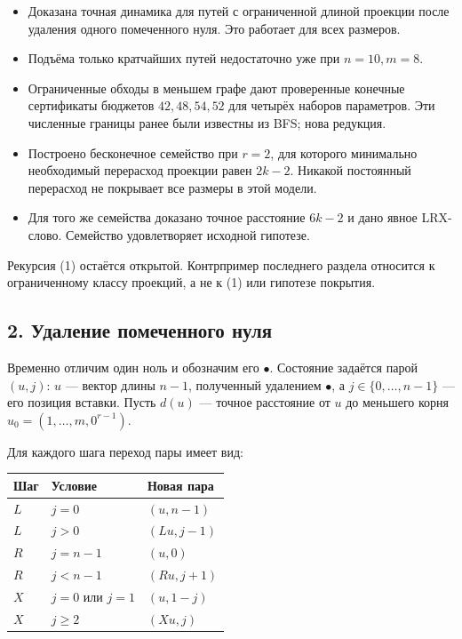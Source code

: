 \documentclass[
  11pt,
  a4paper,
]{article}
\providecommand{\tightlist}{%
  \setlength{\itemsep}{0pt}\setlength{\parskip}{0pt}}
\begin{document}
\begin{itemize}
\tightlist
\item
  Доказана точная динамика для путей с ограниченной длиной проекции
  после удаления одного помеченного нуля. Это работает для всех
  размеров.
\item
  Подъёма только кратчайших путей недостаточно уже при \(n=10,m=8\).
\item
  Ограниченные обходы в меньшем графе дают проверенные конечные
  сертификаты бюджетов \(42,48,54,52\) для четырёх наборов параметров.
  Эти численные границы ранее были известны из BFS; нова редукция.
\item
  Построено бесконечное семейство при \(r=2\), для которого минимально
  необходимый перерасход проекции равен \(2k-2\). Никакой постоянный
  перерасход не покрывает все размеры в этой модели.
\item
  Для того же семейства доказано точное расстояние \(6k-2\) и дано явное
  LRX-слово. Семейство удовлетворяет исходной гипотезе.
\end{itemize}

Рекурсия (1) остаётся открытой. Контрпример последнего раздела относится
к ограниченному классу проекций, а не к (1) или гипотезе покрытия.

\hypertarget{ux443ux434ux430ux43bux435ux43dux438ux435-ux43fux43eux43cux435ux447ux435ux43dux43dux43eux433ux43e-ux43dux443ux43bux44f}{%
\subsection{2. Удаление помеченного
нуля}\label{ux443ux434ux430ux43bux435ux43dux438ux435-ux43fux43eux43cux435ux447ux435ux43dux43dux43eux433ux43e-ux43dux443ux43bux44f}}

Временно отличим один ноль и обозначим его \(\bullet\). Состояние
задаётся парой \((u,j)\): \(u\) --- вектор длины \(n-1\), полученный
удалением \(\bullet\), а \(j\in\{0,\ldots,n-1\}\) --- его позиция
вставки. Пусть \(d(u)\) --- точное расстояние от \(u\) до меньшего корня
\(u_0=(1,\ldots,m,0^{r-1})\).

Для каждого шага переход пары имеет вид:

\begin{longtable}[]{@{}lll@{}}
\toprule\noalign{}
Шаг & Условие & Новая пара \\
\midrule\noalign{}
\endhead
\bottomrule\noalign{}
\endlastfoot
\(L\) & \(j=0\) & \((u,n-1)\) \\
\(L\) & \(j>0\) & \((Lu,j-1)\) \\
\(R\) & \(j=n-1\) & \((u,0)\) \\
\(R\) & \(j<n-1\) & \((Ru,j+1)\) \\
\(X\) & \(j=0\) или \(j=1\) & \((u,1-j)\) \\
\(X\) & \(j\ge2\) & \((Xu,j)\) \\
\end{longtable}
\end{document}
